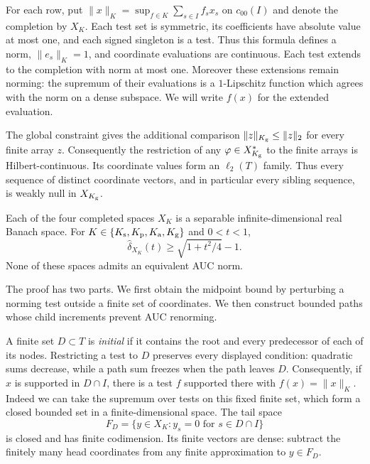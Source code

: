 For each row, put $\|x\|_K=\sup_{f\in K}\sum_{s\in I}f_sx_s$ on
$c_{00}(I)$ and denote the completion by $X_K$. Each test set is symmetric, its coefficients have
absolute value at most one, and each signed singleton is a test. Thus
this formula defines a norm, $\|e_s\|_K=1$, and coordinate evaluations
are continuous. Each test extends to the completion with norm at most
one. Moreover these extensions remain norming: the supremum of their
evaluations is a $1$-Lipschitz function which agrees with the norm on a
dense subspace. We will write $f(x)$ for the extended evaluation.

The global constraint gives the additional comparison
$\|z\|_{K_{\rm g}}\le\|z\|_2$ for every finite array $z$.
Consequently the restriction of any $\varphi\in X_{K_{\rm g}}^*$
to the finite arrays is Hilbert-continuous. Its coordinate values
form an $\ell_2(T)$ family. Thus every sequence of distinct coordinate
vectors, and in particular every sibling sequence, is weakly null
in $X_{K_{\rm g}}$.

\begin{theorem}\label{thm:four}
Each of the four completed spaces $X_K$ is a separable infinite-dimensional
real Banach space. For $K\in\{K_{\rm s},K_{\rm p},K_{\rm a},K_{\rm g}\}$
and $0<t<1$,
\begin{equation}\label{eq:common-bound}
 \widehat\delta_{X_K}(t)\ge\sqrt{1+t^2/4}-1.
\end{equation}
None of these spaces admits an equivalent AUC norm.
\end{theorem}

The proof has two parts. We first obtain the midpoint bound by perturbing
a norming test outside a finite set of coordinates. We then construct
bounded paths whose child increments prevent AUC renorming.

A finite set $D\subset T$ is \emph{initial} if it contains the root
and every predecessor of each of its nodes. Restricting a test to $D$
preserves every displayed condition: quadratic sums decrease, while a
path sum freezes when the path leaves $D$. Consequently, if $x$ is
supported in $D\cap I$, there is a test $f$ supported there with
$f(x)=\|x\|_K$. Indeed we can take the supremum over tests on this fixed
finite set, which form a closed bounded set in a finite-dimensional
space. The tail space
\[
 F_D=\{y\in X_K:y_s=0\text{ for }s\in D\cap I\}
\]
is closed and has finite codimension. Its finite vectors are dense:
subtract the finitely many head coordinates from any finite
approximation to $y\in F_D$.


